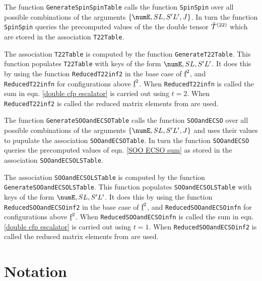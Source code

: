 \documentclass{article}
\newcommand{\codetext}[1]{{\color{BlueViolet} \texttt{#1}}}
\begin{document}
The function \codetext{GenerateSpinSpinTable} calls the function \codetext{SpinSpin} over all possible combinations of the arguments $\{\numE, SL, S'L', J\}$. In turn the function \codetext{SpinSpin} queries the precomputed values of the the double tensor $\hat{\mathcal{T}}^{(22)}_{}$ which are stored in the association \codetext{T22Table}. 

The association \codetext{T22Table} is computed by the function \codetext{GenerateT22Table}. This function populates \codetext{T22Table} with keys of the form ${\numE, SL, S'L'}$. It does this by using the function \codetext{ReducedT22inf2} in the base case of $\underbar{$\text{f}$}^2$, and \codetext{ReducedT22infn} for configurations above $\underbar{$\text{f}$}^2$. When \codetext{ReducedT22infn} is called the sum in eqn. \ref{double cfp escalator} is carried out using $t=2$. When \codetext{ReducedT22inf2} is called the reduced matrix elements from \cite{judd_intra-atomic_1968} are used.


The function \codetext{GenerateSOOandECSOTable} calls the function \codetext{SOOandECSO} over all possible combinations of the arguments $\{\numE, SL, S'L', J\}$ and uses their values to pupulate the association \codetext{SOOandECSOTable}. In turn the function \codetext{SOOandECSO} queries the precomputed values of eqn. \ref{SOO ECSO sum} as stored in the association \codetext{SOOandECSOLSTable}. 

The association \codetext{SOOandECSOLSTable} is computed by the function \codetext{GenerateSOOandECSOLSTable}. This function populates \codetext{SOOandECSOLSTable} with keys of the form ${\numE, SL, S'L'}$. It does this by using the function \codetext{ReducedSOOandECSOinf2} in the base case of $\underbar{$\text{f}$}^2$, and \codetext{ReducedSOOandECSOinfn} for configurations above $\underbar{$\text{f}$}^2$. When \codetext{ReducedSOOandECSOinfn} is called the sum in eqn. \ref{double cfp escalator} is carried out using $t=1$. When \codetext{ReducedSOOandECSOinf2} is called the reduced matrix elements from \cite{judd_intra-atomic_1968} are used.

\section{Notation}
\end{document}
